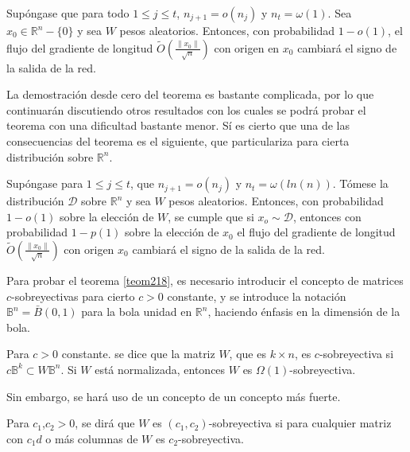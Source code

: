 \begin{teorema} \label{teom218}
Supóngase que para todo $1 \leq j \leq t$, $n_{j+1}=o(n_j)$ y $n_t = \omega(1)$. Sea $x_0 \in \mathbb{R}^n - \{0\}$ y sea $W$ pesos aleatorios. Entonces, con probabilidad $1-o(1)$, el flujo del gradiente de longitud $\tilde{O} \left( \frac{\|x_0 \|}{\sqrt{n}} \right)$ con origen en $x_0$ cambiará el signo de la salida de la red.
\end{teorema}

La demostración desde cero del teorema es bastante complicada, por lo que continuarán discutiendo otros resultados con los cuales se podrá probar el teorema con una dificultad bastante menor. Sí es cierto que una de las consecuencias del teorema es el siguiente, que particulariza  para cierta distribución sobre $\mathbb{R}^n$.

\begin{corolario}
Supóngase para $1 \leq j \leq t$, que $n_{j+1} = o(n_j)$ y $n_t = \omega (ln(n))$. Tómese la distribución $\mathcal{D}$ sobre $\mathbb{R}^n$ y sea $W$ pesos aleatorios. Entonces, con probabilidad $1-o(1)$ sobre la elección de $W$, se cumple que si $x_o \sim \mathcal{D}$, entonces con probabilidad $1-p(1)$ sobre la elección de $x_0$ el flujo del gradiente de longitud $\tilde{O} \left( \frac{\|x_0 \|}{\sqrt{n}} \right)$ con origen $x_0$ cambiará el signo de la salida de la red.
\end{corolario}

Para probar el teorema \ref{teom218}, es necesario introducir el concepto de matrices $c$-sobreyectivas para cierto $c>0$ constante, y se introduce la notación $\mathbb{B}^n = \bar{B}(0,1)$ para la bola unidad en $\mathbb{R}^n$, haciendo énfasis en la dimensión de la bola.

\begin{definicion}
Para $c>0$ constante. se dice que la matriz $W$, que es $k \times n$, es $c$-sobreyectiva si $c \mathbb{B}^k \subset W \mathbb{B}^n$. Si $W$ está normalizada, entonces $W$ es $\Omega(1)$-sobreyectiva.
\end{definicion}

Sin embargo, se hará uso de un concepto de un concepto más fuerte.

\begin{definicion}
Para $c_1$,$c_2 > 0$, se dirá que $W$ es $(c_1,c_2)$-sobreyectiva si para cualquier matriz con $c_1 d$ o más columnas de $W$ es $c_2$-sobreyectiva.
\end{definicion}

